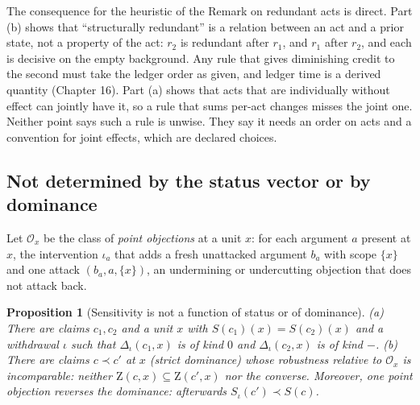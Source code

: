 \documentclass[11pt]{article}
\theoremstyle{plain}
\newtheorem{proposition}[theorem]{Proposition}
\theoremstyle{definition}
\theoremstyle{remark}
\newcommand{\Zs}{\mathrm{Z}}
\begin{document}
The consequence for the heuristic of the Remark on redundant acts is direct. Part (b) shows that ``structurally redundant'' is a relation between an act and a prior state, not a property of the act: $r_2$ is redundant after $r_1$, and $r_1$ after $r_2$, and each is decisive on the empty background. Any rule that gives diminishing credit to the second must take the ledger order as given, and ledger time is a derived quantity (Chapter 16). Part (a) shows that acts that are individually without effect can jointly have it, so a rule that sums per-act changes misses the joint one. Neither point says such a rule is unwise. They say it needs an order on acts and a convention for joint effects, which are declared choices.

\subsection{Not determined by the status vector or by dominance}

Let $\mathcal O_x$ be the class of \emph{point objections} at a unit $x$: for each argument $a$ present at $x$, the intervention $\iota_a$ that adds a fresh unattacked argument $b_a$ with scope $\{x\}$ and one attack $(b_a,a,\{x\})$, an undermining or undercutting objection that does not attack back.

\begin{proposition}[Sensitivity is not a function of status or of dominance]\label{prop:notdom}
(a) There are claims $c_1,c_2$ and a unit $x$ with $S(c_1)(x)=S(c_2)(x)$ and a withdrawal $\iota$ such that $\Delta_\iota(c_1,x)$ is of kind $0$ and $\Delta_\iota(c_2,x)$ is of kind $-$.
(b) There are claims $c\prec c'$ at $x$ (strict dominance) whose robustness relative to $\mathcal O_x$ is incomparable: neither $\Zs(c,x)\subseteq\Zs(c',x)$ nor the converse. Moreover, one point objection reverses the dominance: afterwards $S_\iota(c')\prec S(c)$.
\end{proposition}
\end{document}
